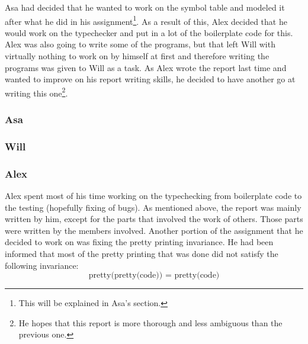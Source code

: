 \documentclass{article}
\begin{document}
 Asa had decided that he wanted to work on the symbol table and modeled it after
 what he did in his assignment\footnote{This will be explained in Asa's section.}.
 As a result of this, Alex decided that he would work on the
 typechecker and put in a lot of the boilerplate code for this. Alex was also
 going to write some of the programs, but that left Will with virtually nothing
 to work on by himself at first and therefore writing the programs was given to
 Will as a task. As Alex wrote the report last time and wanted to improve on his
 report writing skills, he decided to have another go at writing this
 one\footnote{He hopes that this report is more thorough and less ambiguous
 than the previous one.}.

\subsubsection{Asa}


\subsubsection{Will}



\subsubsection{Alex}


Alex spent most of his time working on the typechecking from boilerplate code
to the testing (hopefully fixing of bugs). As mentioned above, the report was
mainly written by him, except for the parts that involved the work of others.
Those parts were written by the members involved. Another portion of the
assignment that he decided to work on was fixing the pretty printing invariance.
He had been informed that most of the pretty printing that was done did not
satisfy the following invariance:
\[
    \text{pretty(pretty(code)) = pretty(code)}
\]
\end{document}
